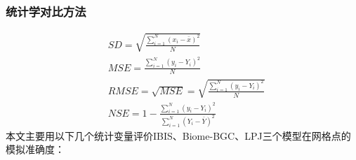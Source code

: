 \subsubsection{统计学对比方法}
\begin{align}
    &SD = \sqrt{\frac{\sum\nolimits_{i=1}^{N}\left(x_i-\bar{x}\right)^2}{N}}
    \label{eq:SD} \\
    &MSE = \frac{\sum\nolimits_{i=1}^{N}\left(y_i-Y_i\right)^2}{N}
    \label{eq:MSE} \\
    &RMSE = \sqrt{MSE} = \sqrt{\frac{\sum\nolimits_{i=1}^{N}\left(y_i-Y_i\right)^2}{N}}
    \label{eq:RMSE}  \\
    &NSE = 1 - \frac{\sum\nolimits_{i=1}^{N}\left(y_i-Y_i\right)^2}{\sum\nolimits_{i=1}^{N}\left(Y_i - \bar{Y}\right)^2} 
    \label{eq:NSE}
\end{align}
本文主要用以下几个统计变量评价IBIS、Biome-BGC、LPJ三个模型在网格点的模拟准确度：
